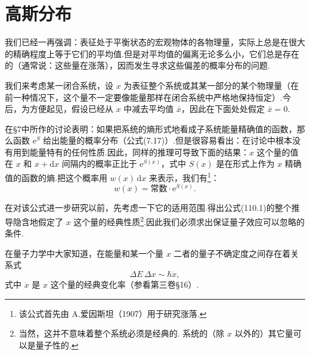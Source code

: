 \section{高斯分布}

我们已经一再强调：表征处于平衡状态的宏观物体的各物理量，实际上总是在很大的精确程度上等于它们的平均值.但是对平均值的偏离无论多么小，它们总是存在的（通常说：这些量在涨落），因而发生寻求这些偏差的概率分布的问题.

我们来考虑某一闭合系统，设 $x$ 为表征整个系统或其某一部分的某个物理量（在前一种情况下，这个量不一定要像能量那样在闭合系统中严格地保持恒定）.今后，为方便起见，假设已经从 $x$ 中减去平均值 $\bar{x}$，因此在下面处处假定 $\bar{x}=0$.

在§7中所作的讨论表明：如果把系统的熵形式地看成子系统能量精确值的函数，那么函数 $\mathrm{e}^{S}$ 给出能量的概率分布（公式(7.17)）.但是很容易看出：在讨论中根本没有用到能量特有的任何性质.因此，同样的推理可导致下面的结果：$x$ 这个量的值在 $x$ 和 $x+\mathrm{d}x$ 间隔内的概率正比于 $\mathrm{e}^{S(x)}$，式中 $S(x)$ 是在形式上作为 $x$ 精确值的函数的熵.把这个概率用 $w(x)\,\mathrm{d}x$ 来表示，我们有\footnote{该公式首先由 A.爱因斯坦（1907）用于研究涨落.}：
\begin{equation}
  w(x)=\text{常数}\cdot\mathrm{e}^{S(x)}.
\end{equation}

在对该公式进一步研究以前，先考虑一下它的适用范围.得出公式(110.1)的整个推导隐含地假定了 $x$ 这个量的经典性质\footnote{当然，这并不意味着整个系统必须是经典的. 系统的（除 $x$ 以外的）其它量可以是量子性的.}.因此我们必须求出保证量子效应可以忽略的条件.

在量子力学中大家知道，在能量和某一个量 $x$ 二者的量子不确定度之间存在着关系式
\begin{equation*}
  \Delta E\,\Delta x\sim\hbar\dot{x},
\end{equation*}
式中 $\dot{x}$ 是 $x$ 这个量的经典变化率（参看第三卷§16）.

